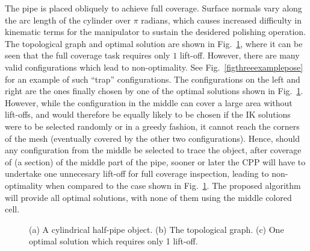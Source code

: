 \documentclass[journal]{IEEEtran}
\begin{document}
The pipe is placed obliquely to achieve full coverage. Surface normals vary along the arc length of the cylinder 
over $\pi$ radians, which causes increased difficulty in kinematic terms for the manipulator 
to sustain the desidered polishing operation. 
The topological graph and optimal solution are shown in Fig.~\ref{fighalfpipe}, where it can be seen that the full coverage task requires only $1$ lift-off. 
However, there are many valid configurations which lead to non-optimality. 
See Fig.~\ref{figthreeexamplepose} for an example of such ``trap'' configurations. 
The configurations on the left and right are the ones finally chosen by one of the optimal solutions shown in Fig.~\ref{fighalfpipe}. 
However, while the configuration in the middle can cover a large area without lift-offs, and would therefore be equally likely to be chosen if the IK solutions were to be selected randomly or in a greedy fashion, it cannot reach the corners of the mesh (eventually covered by the other two configurations). Hence, should any configuration from the middle be selected to trace 
the object, after coverage of (a section) of the middle part of the pipe, sooner or later the CPP will have to undertake one unnecesary lift-off for full coverage inspection, leading to non-optimality when compared to the case shown in Fig.~\ref{fighalfpipe}. The proposed algorithm will provide all optimal solutions, with none of them using the middle colored cell.
\begin{figure}[t]
\centering
{}
\caption{(a) A cylindrical half-pipe object. (b) The topological graph. (c) One optimal solution which requires only 1 lift-off.}\label{fighalfpipe}
\end{figure}
\end{document}
